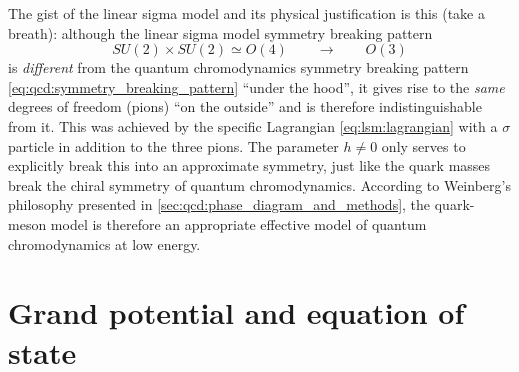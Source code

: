 The gist of the linear sigma model and its physical justification is this (take a breath):
although the linear sigma model symmetry breaking pattern
\begin{equation}
	SU(2) \times SU(2) \simeq O(4) \qquad \longrightarrow \qquad O(3)
\end{equation}
is \emph{different} from the quantum chromodynamics symmetry breaking pattern \eqref{eq:qcd:symmetry_breaking_pattern} ``under the hood'',
it gives rise to the \emph{same} degrees of freedom (pions) ``on the outside'' and is therefore indistinguishable from it.
This was achieved by the specific Lagrangian \eqref{eq:lsm:lagrangian} with a $\sigma$ particle in addition to the three pions.
The parameter $h \neq 0$ only serves to explicitly break this into an approximate symmetry,
just like the quark masses break the chiral symmetry of quantum chromodynamics.
According to Weinberg's philosophy presented in \cref{sec:qcd:phase_diagram_and_methods},
the quark-meson model is therefore an appropriate effective model of quantum chromodynamics at low energy.

\section{Grand potential and equation of state}


